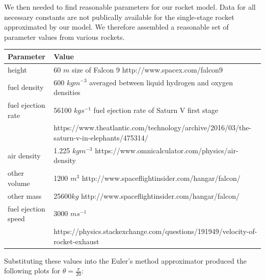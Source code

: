 \documentclass[]{article}
\begin{document}
We then needed to find reasonable parameters for our rocket model. Data for all necessary constants are not publically available for the single-stage rocket approximated by our model. We therefore assembled a reasonable set of parameter values from various rockets. 

\begin{center}
	\begin{tabular} {l l} 
		Parameter & Value \\
		\hline
		height & 60 $m$ size of Falcon 9 http://www.spacex.com/falcon9\\
		fuel density & 600 $kgm^{-3}$ averaged between liquid hydrogen and oxygen densities\\
		fuel ejection rate & 56100 $kg s^{-1}$ fuel ejection rate of Saturn V first stage \\ & \small https://www.theatlantic.com/technology/archive/2016/03/the-saturn-v-in-elephants/475314/ \normalsize\\
		air density & 1.225 $kg m^{-3}$ https://www.omnicalculator.com/physics/air-density\\
		other volume & 1200 $m^3$ http://www.spaceflightinsider.com/hangar/falcon/\\
		other mass  & 25600$kg$  http://www.spaceflightinsider.com/hangar/falcon/ \\
		fuel ejection speed & 3000 $ms^{-1}$ \\ &https://physics.stackexchange.com/questions/191949/velocity-of-rocket-exhaust
	\end{tabular}
\end{center}
	
Substituting these values into the Euler's method approximator produced the following plots for $\theta = \frac{\pi}{20}$:
\end{document}
